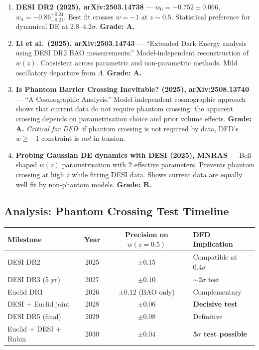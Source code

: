 \documentclass[11pt,a4paper]{article}
\begin{document}
\begin{enumerate}

\item \textbf{DESI DR2 (2025), arXiv:2503.14738} --- $w_0 = -0.752 \pm 0.066$, $w_a = -0.86^{+0.24}_{-0.21}$. Best fit crosses $w = -1$ at $z \sim 0.5$. Statistical preference for dynamical DE at $2.8$--$4.2\sigma$. \textbf{Grade: A.}

\item \textbf{Li et al.\ (2025), arXiv:2503.14743} --- ``Extended Dark Energy analysis using DESI DR2 BAO measurements.'' Model-independent reconstruction of $w(z)$. Consistent across parametric and non-parametric methods. Mild oscillatory departure from $\Lambda$. \textbf{Grade: A.}

\item \textbf{Is Phantom Barrier Crossing Inevitable? (2025), arXiv:2508.13740} --- ``A Cosmographic Analysis.'' Model-independent cosmographic approach shows that current data do not require phantom crossing: the apparent crossing depends on parametrisation choice and prior volume effects. \textbf{Grade: A.} \emph{Critical for DFD}: if phantom crossing is not required by data, DFD's $w \geq -1$ constraint is \emph{not} in tension.

\item \textbf{Probing Gaussian DE dynamics with DESI (2025), MNRAS} --- Bell-shaped $w(z)$ parametrisation with 2 effective parameters. Prevents phantom crossing at high $z$ while fitting DESI data. Shows current data are equally well fit by non-phantom models. \textbf{Grade: B.}

\end{enumerate}

\subsection{Analysis: Phantom Crossing Test Timeline}

\begin{center}
\begin{tabular}{lccl}
\toprule
\textbf{Milestone} & \textbf{Year} & \textbf{Precision on $w(z=0.5)$} & \textbf{DFD Implication} \\
\midrule
DESI DR2 & 2025 & $\pm 0.15$ & Compatible at $0.4\sigma$ \\
DESI DR3 (5 yr) & 2027 & $\pm 0.10$ & $\sim$2$\sigma$ test \\
Euclid DR1 & 2026 & $\pm 0.12$ (BAO only) & Complementary \\
DESI + Euclid joint & 2028 & $\pm 0.06$ & \textbf{Decisive test} \\
DESI DR5 (final) & 2029 & $\pm 0.08$ & Definitive \\
Euclid + DESI + Rubin & 2030 & $\pm 0.04$ & \textbf{5$\sigma$ test possible} \\
\bottomrule
\end{tabular}
\end{center}
\end{document}
